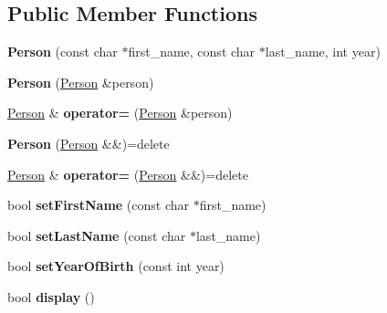 \subsection*{Public Member Functions}
\begin{DoxyCompactItemize}
\item 
\mbox{\label{class_person_acbc096c55092573ff4abcc2b2b641d04}} 
{\bfseries Person} (const char $\ast$first\+\_\+name, const char $\ast$last\+\_\+name, int year)
\item 
\mbox{\label{class_person_ab1ac927894f248bdc88f3b65642d7a1b}} 
{\bfseries Person} (\mbox{\hyperlink{class_person}{Person}} \&person)
\item 
\mbox{\label{class_person_aa5bbd58328d2fc888e10e5da888fcd27}} 
\mbox{\hyperlink{class_person}{Person}} \& {\bfseries operator=} (\mbox{\hyperlink{class_person}{Person}} \&person)
\item 
\mbox{\label{class_person_a34adff5582df6e25ab432171a5ac0b88}} 
{\bfseries Person} (\mbox{\hyperlink{class_person}{Person}} \&\&)=delete
\item 
\mbox{\label{class_person_a46e67bdc77c2ec5c45659c8ab3d1dfbe}} 
\mbox{\hyperlink{class_person}{Person}} \& {\bfseries operator=} (\mbox{\hyperlink{class_person}{Person}} \&\&)=delete
\item 
\mbox{\label{class_person_aac8ec645eb778c26dd9a9b36946c0a86}} 
bool {\bfseries set\+First\+Name} (const char $\ast$first\+\_\+name)
\item 
\mbox{\label{class_person_ae17d9c12fa0243ff8cf92ec7b5e9edd8}} 
bool {\bfseries set\+Last\+Name} (const char $\ast$last\+\_\+name)
\item 
\mbox{\label{class_person_a24b9323743af7870100d4d6b2a096be7}} 
bool {\bfseries set\+Year\+Of\+Birth} (const int year)
\item 
\mbox{\label{class_person_a5d95a38a24b0db2695df8de4874a4a16}} 
bool {\bfseries display} ()
\item 
\mbox{\label{class_person_a2495b3477c4e48421a3a4ba6099ef92c}} 

\end{DoxyCompactItemize}
